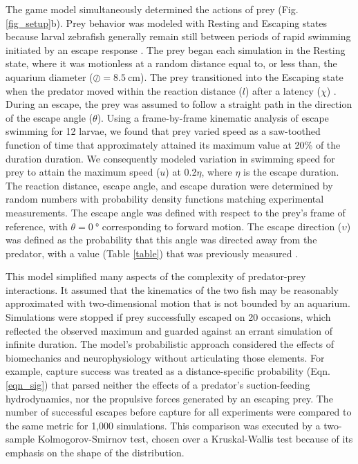 \documentclass[]{rsos}%
\begin{document}
The game model simultaneously determined the actions of prey (Fig. \ref{fig_setup}b).
Prey behavior was modeled with Resting and Escaping states because larval zebrafish generally remain still between periods of rapid swimming initiated by an escape response \cite{Stewart:2013bha, Stewart:2014cma}. 
The prey began each simulation in the Resting state, where it was motionless at a random distance equal to, or less than, the aquarium diameter ($\oslash = \SI{8.5}{\cm}$).
The prey transitioned into the Escaping state when the predator moved within the reaction distance ($l$) after a latency ($\chi$) \cite{Nair:2015gk}.
During an escape, the prey was assumed to follow a straight path in the direction of the escape angle ($\theta$).
Using a frame-by-frame kinematic analysis of escape swimming for 12 larvae, we found that prey varied speed as a saw-toothed function of time that approximately attained its maximum value at 20\% of the duration duration. 
We consequently modeled variation in swimming speed for prey to attain the maximum speed ($u$) at 0.2$\eta$, where $\eta$ is the escape duration. 
The reaction distance, escape angle, and escape duration were determined by random numbers with probability density functions matching experimental measurements.
The escape angle was defined with respect to the prey's frame of reference, with $\theta =  \SI{0}{\degree}$ corresponding to forward motion.
The escape direction ($\upsilon$) was defined as the probability that this angle was directed away from the predator, with a value (Table \ref{table}) that was previously measured \cite{Stewart:2014cma}.

This model simplified many aspects of the complexity of predator-prey interactions.
It assumed that the kinematics of the two fish may be reasonably approximated with two-dimensional motion that is not bounded by an aquarium. 
Simulations were stopped if prey successfully escaped on 20 occasions, which reflected the observed maximum and guarded against an errant simulation of infinite duration.
The model's probabilistic approach considered the effects of biomechanics and neurophysiology without articulating those elements.
For example, capture success was treated as a distance-specific probability (Eqn. \ref{eqn_sig}) that parsed neither the effects of a predator's suction-feeding hydrodynamics, nor the propulsive forces generated by an escaping prey.
The number of successful escapes before capture for all experiments were compared to the same metric for 1,000 simulations.  
This comparison was executed by a two-sample Kolmogorov-Smirnov test, chosen over a Kruskal-Wallis test because of its emphasis on the shape of the distribution.  
\end{document}
